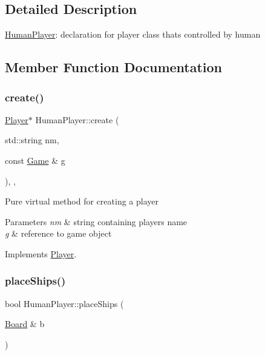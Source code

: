 \subsection{Detailed Description}
\mbox{\hyperlink{class_human_player}{Human\+Player}}\+: declaration for player class that\textquotesingle{}s controlled by human 

\subsection{Member Function Documentation}
\mbox{\label{class_human_player_acc99520ffa6b0a1885d081fde6f2297b}} 
\subsubsection{\texorpdfstring{create()}{create()}}
{\footnotesize\ttfamily \mbox{\hyperlink{class_player}{Player}}$\ast$ Human\+Player\+::create (\begin{DoxyParamCaption}\item[{std\+::string}]{nm,  }\item[{const \mbox{\hyperlink{class_game}{Game}} \&}]{g }\end{DoxyParamCaption})\hspace{0.3cm}{\ttfamily [inline]}, {\ttfamily [override]}, {\ttfamily [virtual]}}

Pure virtual method for creating a player 
\begin{DoxyParams}{Parameters}
{\em nm} & string containing player\textquotesingle{}s name \\
\hline
{\em g} & reference to game object \\
\hline
\end{DoxyParams}


Implements \mbox{\hyperlink{class_player_a9b9133f3347894da1416953048cecdb2}{Player}}.

\mbox{\label{class_human_player_ae9315a3c66f6b2f2bf4d1ebb09669aff}} 
\subsubsection{\texorpdfstring{place\+Ships()}{placeShips()}}
{\footnotesize\ttfamily bool Human\+Player\+::place\+Ships (\begin{DoxyParamCaption}\item[{\mbox{\hyperlink{class_board}{Board}} \&}]{b }\end{DoxyParamCaption})\hspace{0.3cm}{\ttfamily [virtual]}}

